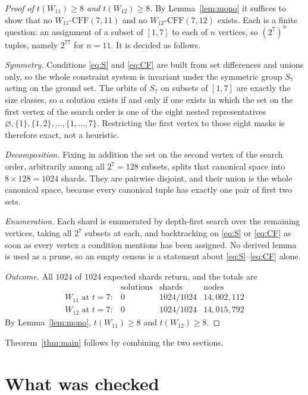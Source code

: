 \documentclass[11pt]{amsart}
\newcommand{\CFF}{\mathrm{CFF}}
\begin{document}
\begin{proof}[Proof of $t(W_{11})\ge 8$ and $t(W_{12})\ge 8$]
By Lemma~\ref{lem:mono} it suffices to show that no $W_{11}$-$\CFF(7,11)$ and
no $W_{12}$-$\CFF(7,12)$ exists. Each is a finite question: an assignment of a
subset of $[1,7]$ to each of $n$ vertices, so $(2^7)^n$ tuples, namely $2^{77}$
for $n=11$. It is decided as follows.

\emph{Symmetry.} Conditions \eqref{eq:S} and \eqref{eq:CF} are built from set
differences and unions only, so the whole constraint system is invariant under
the symmetric group $S_7$ acting on the ground set. The orbits of $S_7$ on
subsets of $[1,7]$ are exactly the size classes, so a solution exists if and
only if one exists in which the set on the first vertex of the search order is
one of the eight nested representatives
$\varnothing,\{1\},\{1,2\},\dots,\{1,\dots,7\}$. Restricting the first vertex
to those eight masks is therefore exact, not a heuristic.

\emph{Decomposition.} Fixing in addition the set on the second vertex of the
search order, arbitrarily among all $2^7=128$ subsets, splits that canonical
space into $8\times128=1024$ shards. They are pairwise disjoint, and their union
is the whole canonical space, because every canonical tuple has exactly one pair
of first two sets.

\emph{Enumeration.} Each shard is enumerated by depth-first search over the
remaining vertices, taking all $2^7$ subsets at each, and backtracking on
\eqref{eq:S} or \eqref{eq:CF} as soon as every vertex a condition mentions has
been assigned. No derived lemma is used as a prune, so an empty census is a
statement about \eqref{eq:S}--\eqref{eq:CF} alone.

\emph{Outcome.} All $1024$ of $1024$ expected shards return, and the totals are
\[
\begin{array}{lccc}
 & \text{solutions} & \text{shards} & \text{nodes}\\
 W_{11}\text{ at }t=7: & 0 & 1024/1024 & 14{,}002{,}112\\
 W_{12}\text{ at }t=7: & 0 & 1024/1024 & 14{,}015{,}792
\end{array}
\]
By Lemma~\ref{lem:mono}, $t(W_{11})\ge8$ and $t(W_{12})\ge8$.
\end{proof}

Theorem~\ref{thm:main} follows by combining the two sections.

\section{What was checked}\label{sec:status}
\end{document}
